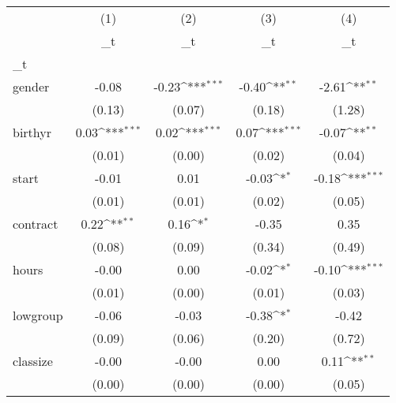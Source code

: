 \documentclass{article}
\begin{document}
{
\def\sym#1{\ifmmode^{#1}\else\(^{#1}\)\fi}
\begin{tabular}{l*{4}{c}}
\hline\hline
            &\multicolumn{1}{c}{(1)}&\multicolumn{1}{c}{(2)}&\multicolumn{1}{c}{(3)}&\multicolumn{1}{c}{(4)}\\
            &\multicolumn{1}{c}{\_t}&\multicolumn{1}{c}{\_t}&\multicolumn{1}{c}{\_t}&\multicolumn{1}{c}{\_t}\\
\hline
\_t          &                     &                     &                     &                     \\
gender      &       -0.08         &       -0.23\sym{***}&       -0.40\sym{**} &       -2.61\sym{**} \\
            &      (0.13)         &      (0.07)         &      (0.18)         &      (1.28)         \\
[1em]
birthyr     &        0.03\sym{***}&        0.02\sym{***}&        0.07\sym{***}&       -0.07\sym{**} \\
            &      (0.01)         &      (0.00)         &      (0.02)         &      (0.04)         \\
[1em]
start       &       -0.01         &        0.01         &       -0.03\sym{*}  &       -0.18\sym{***}\\
            &      (0.01)         &      (0.01)         &      (0.02)         &      (0.05)         \\
[1em]
contract    &        0.22\sym{**} &        0.16\sym{*}  &       -0.35         &        0.35         \\
            &      (0.08)         &      (0.09)         &      (0.34)         &      (0.49)         \\
[1em]
hours       &       -0.00         &        0.00         &       -0.02\sym{*}  &       -0.10\sym{***}\\
            &      (0.01)         &      (0.00)         &      (0.01)         &      (0.03)         \\
[1em]
lowgroup    &       -0.06         &       -0.03         &       -0.38\sym{*}  &       -0.42         \\
            &      (0.09)         &      (0.06)         &      (0.20)         &      (0.72)         \\
[1em]
classize    &       -0.00         &       -0.00         &        0.00         &        0.11\sym{**} \\
            &      (0.00)         &      (0.00)         &      (0.00)         &      (0.05)         \\

\end{tabular}}
\end{document}
